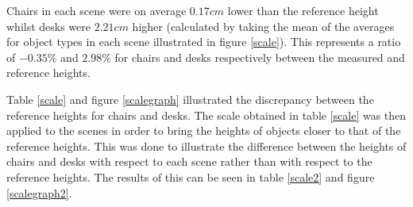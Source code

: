 Chairs in each scene were on average $0.17cm$ lower than the reference height whilst desks were $ 2.21cm $ higher (calculated by taking the mean of the averages for object types in each scene illustrated in figure \ref{scale}). This represents a ratio of $-0.35\%$ and $2.98\%$ for chairs and desks respectively between the measured and reference heights. 

Table \ref{scale} and figure \ref{scalegraph} illustrated the discrepancy between the reference heights for chairs and desks. The scale obtained in table \ref{scale} was then applied to the scenes in order to bring the heights of objects closer to that of the reference heights. This was done to illustrate the difference between the heights of chairs and desks with respect to each scene rather than with respect to the reference heights. The results of this can be seen in table \ref{scale2} and figure \ref{scalegraph2}.


